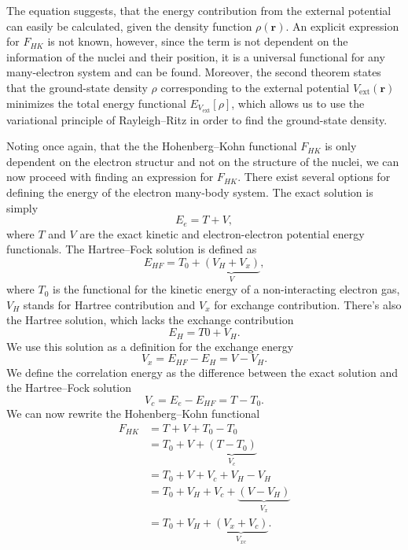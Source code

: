 The equation \label{eq:hk-2} suggests, that the energy contribution from the
external potential can easily be calculated, given the density function
$\rho(\mathbf{r})$. An explicit expression for $F_{HK}$ is not known,
however, since the term is not dependent on the information of the nuclei and
their position, it is a universal functional for any many-electron system and
can be found. Moreover, the second theorem states that the ground-state
density $\rho$ corresponding to the external potential
$V_\mathrm{ext}(\mathbf{r})$ minimizes the total energy functional
$E_{V_\mathrm{ext}}[\rho]$, which allows us to use the variational principle
of Rayleigh--Ritz in order to find the ground-state density.

Noting once again, that the the Hohenberg--Kohn functional $F_{HK}$ is only
dependent on the electron structur and not on the structure of the nuclei, we
can now proceed with finding an expression for $F_{HK}$. There exist several
options for defining the energy of the electron many-body system. The exact
solution is simply
\begin{equation}
  E_e = T + V,
\end{equation}
where $T$ and $V$ are the exact kinetic and electron-electron potential energy
functionals. The Hartree--Fock solution is defined as
\begin{equation}
  E_{HF} = T_0 + \underbrace{(V_H + V_x)}_V,
\end{equation}
where $T_0$ is the functional for the kinetic energy of a non-interacting
electron gas, $V_H$ stands for Hartree contribution and $V_x$ for exchange
contribution. There's also the Hartree solution, which lacks the exchange
contribution
\begin{equation}
  E_H = T0 + V_H.
\end{equation}
We use this solution as a definition for the exchange energy
\begin{equation}
  V_x = E_{HF} - E_H = V - V_H.
\end{equation}
We define the correlation energy as the difference between the
exact solution and the Hartree--Fock solution
\begin{equation}
  V_c = E_e - E_{HF} = T - T_0.
\end{equation}
We can now rewrite the Hohenberg--Kohn functional
\begin{equation}
\begin{alignedat}{2}
  F_{HK} &= T + V + T_0 - T_0 \\
  &= T_0 + V + \underbrace{(T - T_0)}_{V_c} \\
  &= T_0 + V + V_c + V_H - V_H \\
  &= T_0 + V_H + V_c + \underbrace{(V - V_H)}_{V_x} \\
  &= T_0 + V_H + \underbrace{(V_x + V_c)}_{V_{xc}}.
\end{alignedat}
\end{equation}
